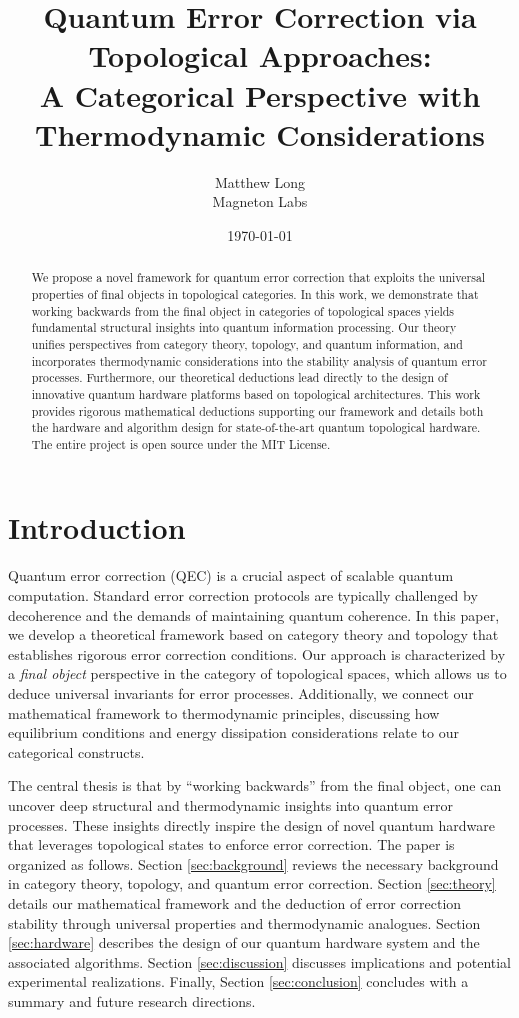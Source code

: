 \documentclass[11pt]{article}
\title{Quantum Error Correction via Topological Approaches: \\ A Categorical Perspective with Thermodynamic Considerations}
\author{Matthew Long \\
Magneton Labs}
\date{\today}
\begin{document}
\maketitle

\begin{abstract}
We propose a novel framework for quantum error correction that exploits the universal properties of final objects in topological categories. In this work, we demonstrate that working backwards from the final object in categories of topological spaces yields fundamental structural insights into quantum information processing. Our theory unifies perspectives from category theory, topology, and quantum information, and incorporates thermodynamic considerations into the stability analysis of quantum error processes. Furthermore, our theoretical deductions lead directly to the design of innovative quantum hardware platforms based on topological architectures. This work provides rigorous mathematical deductions supporting our framework and details both the hardware and algorithm design for state-of-the-art quantum topological hardware. The entire project is open source under the MIT License.
\end{abstract}

\section{Introduction}
Quantum error correction (QEC) is a crucial aspect of scalable quantum computation. Standard error correction protocols are typically challenged by decoherence and the demands of maintaining quantum coherence. In this paper, we develop a theoretical framework based on category theory and topology that establishes rigorous error correction conditions. Our approach is characterized by a \emph{final object} perspective in the category of topological spaces, which allows us to deduce universal invariants for error processes. Additionally, we connect our mathematical framework to thermodynamic principles, discussing how equilibrium conditions and energy dissipation considerations relate to our categorical constructs.

The central thesis is that by ``working backwards'' from the final object, one can uncover deep structural and thermodynamic insights into quantum error processes. These insights directly inspire the design of novel quantum hardware that leverages topological states to enforce error correction. The paper is organized as follows. Section \ref{sec:background} reviews the necessary background in category theory, topology, and quantum error correction. Section \ref{sec:theory} details our mathematical framework and the deduction of error correction stability through universal properties and thermodynamic analogues. Section \ref{sec:hardware} describes the design of our quantum hardware system and the associated algorithms. Section \ref{sec:discussion} discusses implications and potential experimental realizations. Finally, Section \ref{sec:conclusion} concludes with a summary and future research directions.
\end{document}
